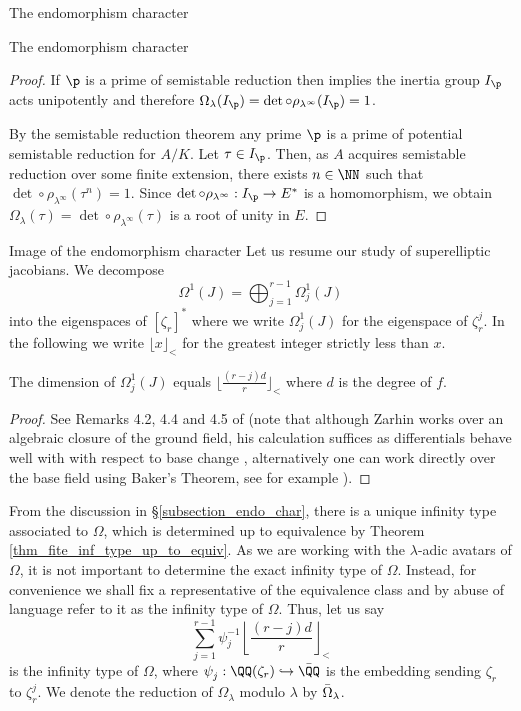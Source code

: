 \documentclass[11pt,a4paper]{article}
\newcommand{\lam}{\lambda}
\newcommand{\Qr}{{\QQ(\zeta_r)}}
\newcommand{\zr}{\zeta_r}
\begin{document}
\begin{section}{The endomorphism character}
\begin{subsection}{The endomorphism character}
\begin{proof}
If $\p$ is a prime of semistable reduction then \cite[Proposition 3.5]{SGA7} \cite[Page 184, Thm 6]{Neron_models_BLR_book} implies the inertia group $I_\p$ acts unipotently and therefore $\Omega_\lambda(I_\p) = \det \circ \rho_{\lam^\infty}(I_\p)=1$.


By the semistable reduction theorem \cite{SGA7} any prime $\p$ is a prime of potential semistable reduction for $A/K$. Let $\tau\in I_\p$. Then, as $A$ acquires semistable reduction over some finite extension, there exists $n \in \NN$ such that $\det \circ \rho_{\lam^\infty}(\tau^n)=1$. Since $\det \circ \rho_{\lam^\infty}: I_\p \rightarrow E^*$ is a homomorphism, we obtain $\Omega_\lam (\tau) =\det \circ \rho_{\lam^\infty}(\tau)$ is a root of unity in $E$.
\end{proof}
\end{subsection}
\begin{subsection}{Image of the endomorphism character}
Let us resume our study of superelliptic jacobians. 
We decompose
\[\Omega^1(J) = \bigoplus_{j=1}^{r-1} \Omega^1_j(J)\] into the eigenspaces of $[\zr]^*$ where we write $\Omega^1_j(J)$ for the eigenspace of $\zr^j$.
In the following we write $\lfloor x \rfloor_< $ for the greatest integer strictly less than $x$.

\begin{lemma}
    The dimension of $\Omega^1_j(J)$ equals $\lfloor \frac{(r-j)d}{r} \rfloor_< $ where $d$ is the degree of $f$.
\end{lemma}

\begin{proof}
See Remarks 4.2, 4.4 and 4.5 of \cite{Zarhin} (note that although Zarhin works over an algebraic closure of the ground field, his calculation suffices as differentials behave well with with respect to base change \cite[Lemma 5.2.26]{Liu}, alternatively one can work directly over the base field using Baker's Theorem, see for example \cite[Theorem 2.2]{Models_Curves_DVR}).
\end{proof}

From the discussion in \S \ref{subsection_endo_char}, there is a unique infinity type associated to $\Omega$, which is determined up to equivalence by Theorem \ref{thm_fite_inf_type_up_to_equiv}.
As we are working with the $\lambda$-adic avatars of $\Omega$, it is not important to determine the exact infinity type of $\Omega$.
Instead, for convenience we shall fix a representative of the equivalence class and by abuse of language refer to it as the infinity type of $\Omega$.
Thus, let us say
\[ \sum_{j=1}^{r-1} \psi_j^{-1}{\left\lfloor \frac{(r-j)d}{r} \right\rfloor_<}
\]
is the infinity type of $\Omega$, where $\psi_j^{}:\Qr \hookrightarrow \Bar{\QQ}$ is the embedding sending $\zr$ to $\zr^{j}$. We denote the reduction of $\Omega_{\lambda}$ modulo $\lambda$ by $\Bar{\Omega}_{\lambda}$.




\end{subsection}
\end{section}
\end{document}
